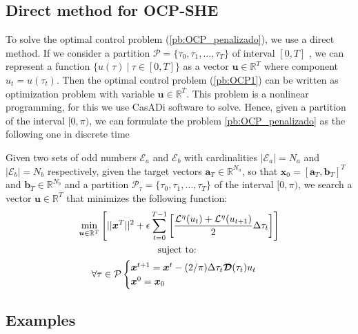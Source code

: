\subsection{Direct method  for  OCP-SHE}

To solve the optimal control problem (\ref{pb:OCP_penalizado}), we use a direct method. 
%
If we consider a partition $\mathcal{P} = \{\tau_0,\tau_1,\dots,\tau_{T}\}$ of interval $[0,T]$ , we can represent a function $\{ u(\tau) \ | \ \tau \in [0,T]\}$ as a vector $\bm{u} \in \mathbb{R}^{T}$ where component $u_t = u(\tau_t)$.  
%
Then the optimal control problem (\ref{pb:OCP1}) can be written as optimization problem with variable $\bm{u} \in \mathbb{R}^{T}$. This problem is a nonlinear programming, for this we use CasADi software to solve. 
%
Hence, given a partition of the interval $[0,\pi)$, we can formulate the problem \ref{pb:OCP_penalizado} as the following one in discrete time
\newline

\begin{problem}\label{pb:numOCP2}
Given two sets of odd numbers $\mathcal{E}_a$ and $\mathcal{E}_b$ with cardinalities $|\mathcal{E}_a| = N_a$ and $|\mathcal{E}_b| = N_b$ respectively, given the target vectors $\bm{a}_T  \in \mathbb{R}^{N_a}$, so that $\bm{x}_0 = [\bm{a}_T,\bm{b}_T]^T$ and $\bm{b}_T \in \mathbb{R}^{N_b}$ and a partition $\mathcal{P}_\tau = \{\tau_0,\tau_1,\dots,\tau_{T}\}$ of the interval $[0,\pi)$, we search a vector $\bm{u} \in \mathbb{R}^{T}$ that minimizes the following function:
\begin{gather}
        \min_{\bm{u} \in \mathbb{R}^{T} } 
        \Bigg[ 
        || \bm{x}^{T}||^2
        + \epsilon  
        \sum_{t=0}^{T-1} 
            \bigg[ \frac{\mathcal{L}^\eta(u_{t}) + \mathcal{L}^\eta(u_{t+1})}{2}\Delta\tau_t \bigg]  \Bigg]  \\
        \notag \text{suject to: } \\
        \forall \tau \in \mathcal{P} \begin{cases}
            \bm{x}^{t+1} = \bm{x}^{t} - (2/\pi)\Delta \tau_t \bm{\mathcal{D}}(\tau_t)u_t \\
            \bm{x}^0 = \bm{x}_0
        \end{cases} 
\end{gather}
\end{problem}

\subsection{Examples}

